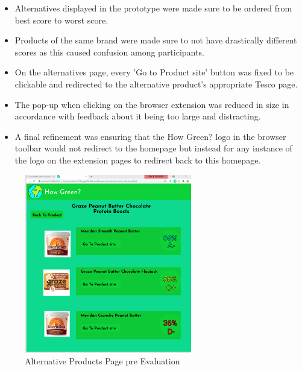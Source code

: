 \documentclass[a4,10pt,twocolumn]{article}
\begin{document}
\begin{itemize}
    \item Alternatives displayed in the prototype were made sure to be ordered from best score to worst score.
    \item Products of the same brand were made sure to not have drastically different scores as this caused confusion among participants.
    \item On the alternatives page, every 'Go to Product site' button was fixed to be clickable and redirected to the alternative product's appropriate Tesco page.
    \item The pop-up when clicking on the browser extension was reduced in size in accordance with feedback about it being too large and distracting.
    \item A final refinement was ensuring that the How Green? logo in the browser toolbar would not redirect to the homepage but instead for any instance of the logo on the extension pages to redirect back to this homepage.   
\end{itemize}
\begin{figure}[h]
    \centering
    \includegraphics[width=0.75\columnwidth]{assets/prototype/pre_eval.PNG}
    \caption{Alternative Products Page pre Evaluation}
\end{figure}
\end{document}

